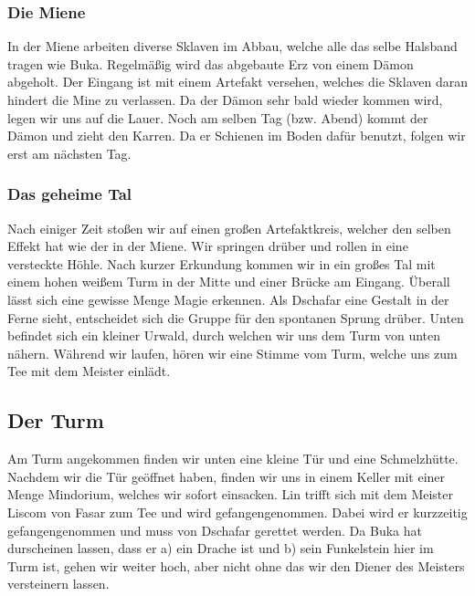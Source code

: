 \hypertarget{die-miene}{%
\subsubsection{Die Miene}\label{die-miene}}

In der Miene arbeiten diverse Sklaven im Abbau, welche alle das selbe
Halsband tragen wie Buka. Regelmäßig wird das abgebaute Erz von einem
Dämon abgeholt. Der Eingang ist mit einem Artefakt versehen, welches die
Sklaven daran hindert die Mine zu verlassen. Da der Dämon sehr bald
wieder kommen wird, legen wir uns auf die Lauer. Noch am selben Tag
(bzw. Abend) kommt der Dämon und zieht den Karren. Da er Schienen im
Boden dafür benutzt, folgen wir erst am nächsten Tag.

\hypertarget{das-geheime-tal}{%
\subsubsection{Das geheime Tal}\label{das-geheime-tal}}

Nach einiger Zeit stoßen wir auf einen großen Artefaktkreis, welcher den
selben Effekt hat wie der in der Miene. Wir springen drüber und rollen
in eine versteckte Höhle. Nach kurzer Erkundung kommen wir in ein großes
Tal mit einem hohen weißem Turm in der Mitte und einer Brücke am
Eingang. Überall lässt sich eine gewisse Menge Magie erkennen. Als
Dschafar eine Gestalt in der Ferne sieht, entscheidet sich die Gruppe
für den spontanen Sprung drüber. Unten befindet sich ein kleiner Urwald,
durch welchen wir uns dem Turm von unten nähern. Während wir laufen,
hören wir eine Stimme vom Turm, welche uns zum Tee mit dem Meister
einlädt.

\hypertarget{der-turm}{%
\subsection{Der Turm}\label{der-turm}}

Am Turm angekommen finden wir unten eine kleine Tür und eine
Schmelzhütte. Nachdem wir die Tür geöffnet haben, finden wir uns in
einem Keller mit einer Menge Mindorium, welches wir sofort einsacken.
Lin trifft sich mit dem Meister Liscom von Fasar zum Tee und wird
gefangengenommen. Dabei wird er kurzzeitig gefangengenommen und muss von
Dschafar gerettet werden. Da Buka hat durscheinen lassen, dass er a) ein
Drache ist und b) sein Funkelstein hier im Turm ist, gehen wir weiter
hoch, aber nicht ohne das wir den Diener des Meisters versteinern
lassen.

